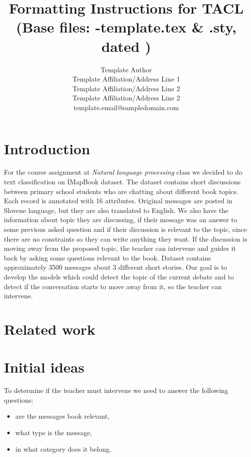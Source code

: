 \documentclass[11pt,a4paper]{article}
\title{Formatting Instructions for TACL \TaclPapers \\
(Base files: \styleFileVersion-template.tex \& \styleFileVersion.sty, dated \dateOfLastUpdate)}
\author{
 Template Author\Thanks{The {\em actual} contributors to this instruction
 document and corresponding template file are given in Section
 \ref{sec:contributors}.} \\
 Template Affiliation/Address Line 1 \\
 Template Affiliation/Address Line 2 \\
 Template Affiliation/Address Line 2 \\
  {\sf template.email@sampledomain.com} \\
}
\date{}
\newcommand{\taclpaper}{final version\xspace}
\newcommand{\taclpapers}{final versions\xspace}
\newcommand{\taclpaper}{submission\xspace}
\newcommand{\taclpapers}{{\taclpaper}s\xspace}
\begin{document}
\maketitle


\section{Introduction}
For the course assignment at \textit{Natural language processing} class we decided to do text classification on IMapBook dataset.
The dataset contains short discussions between primary school students who are chatting about different book topics.
Each record is annotated with 16 attributes.
Original messages are posted in Slovene language, but they are also translated to English.
We also have the information about topic they are discussing, if their message was an answer to some previous asked question and if their discussion is relevant to the topic, since there are no constraints so they can write anything they want.
If the discussion is moving away from the proposed topic, the teacher can intervene and guides it back by asking some questions relevant to the book.
Dataset contains approximately 3500 messages about 3 different short stories.
Our goal is to develop the models which could detect the topic of the current debate and to detect if the conversation starts to move away from it, so the teacher can intervene.

\section{Related work}


\section{Initial ideas}

To determine if the teacher must intervene we need to answer the following questions:
\begin{itemize}
\item{are the messages book relevant,}
\item{what type is the message,}
\item{in what category does it belong.}
\end{itemize}
\end{document}
